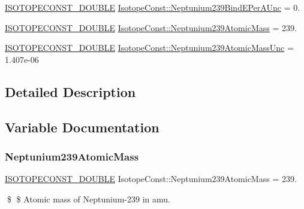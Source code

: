 \begin{DoxyCompactItemize}
\mbox{\hyperlink{group___isotope_const-_macros_ga8f45a7272ce02c0b4c65c44636ed719a}{I\+S\+O\+T\+O\+P\+E\+C\+O\+N\+S\+T\+\_\+\+D\+O\+U\+B\+LE}} \mbox{\hyperlink{group___isotope_const-_neptunium-_np239_gacf769e187b972863618f15bb93fdb043}{Isotope\+Const\+::\+Neptunium239\+Bind\+E\+Per\+A\+Unc}} = 0.
\item 
\mbox{\hyperlink{group___isotope_const-_macros_ga8f45a7272ce02c0b4c65c44636ed719a}{I\+S\+O\+T\+O\+P\+E\+C\+O\+N\+S\+T\+\_\+\+D\+O\+U\+B\+LE}} \mbox{\hyperlink{group___isotope_const-_neptunium-_np239_gace3993b61cc2e9f8fcad4b18837f9e6e}{Isotope\+Const\+::\+Neptunium239\+Atomic\+Mass}} = 239.
\item 
\mbox{\hyperlink{group___isotope_const-_macros_ga8f45a7272ce02c0b4c65c44636ed719a}{I\+S\+O\+T\+O\+P\+E\+C\+O\+N\+S\+T\+\_\+\+D\+O\+U\+B\+LE}} \mbox{\hyperlink{group___isotope_const-_neptunium-_np239_ga126e82ab3b9e7dc67c8dc08db13c7877}{Isotope\+Const\+::\+Neptunium239\+Atomic\+Mass\+Unc}} = 1.\+407e-\/06
\end{DoxyCompactItemize}


\subsection{Detailed Description}


\subsection{Variable Documentation}
\mbox{\label{group___isotope_const-_neptunium-_np239_gace3993b61cc2e9f8fcad4b18837f9e6e}} 
\subsubsection{\texorpdfstring{Neptunium239\+Atomic\+Mass}{Neptunium239AtomicMass}}
{\footnotesize\ttfamily \mbox{\hyperlink{group___isotope_const-_macros_ga8f45a7272ce02c0b4c65c44636ed719a}{I\+S\+O\+T\+O\+P\+E\+C\+O\+N\+S\+T\+\_\+\+D\+O\+U\+B\+LE}} Isotope\+Const\+::\+Neptunium239\+Atomic\+Mass = 239.}

\$ \$ Atomic mass of Neptunium-\/239 in amu. \mbox{\label{group___isotope_const-_neptunium-_np239_ga126e82ab3b9e7dc67c8dc08db13c7877}} 
